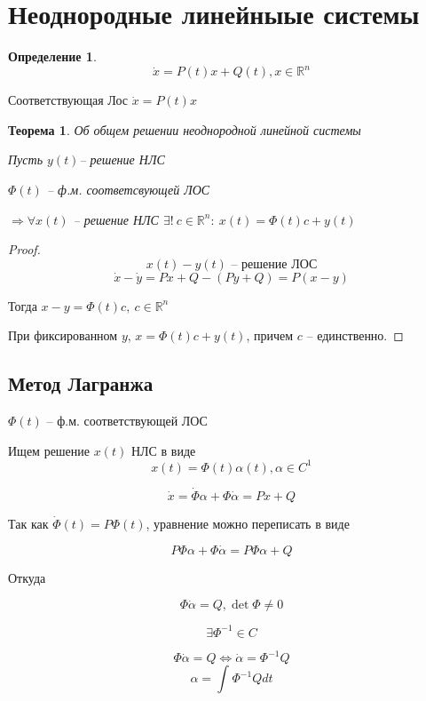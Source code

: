 \documentclass[a4paper]{article}
\theoremstyle{indented}
\newtheorem*{theorem}{Теорема}
\theoremstyle{definition}
\newtheorem*{defn}{Определение}
\theoremstyle{remark}
\begin{document}
\section{Неоднородные линейныые системы}
\begin{defn}
  \[\dot x = P(t) x + Q(t), x \in \mathbb{R}^n\]
\end{defn}
\begin{center}
  Соответствующая Лос $\dot x = P(t) x$
\end{center}

\begin{theorem}
  Об общем решении неоднородной линейной системы

  Пусть $y(t) $-- решение НЛС

  $\Phi(t)$ -- ф.м. соответсвующей ЛОС

  $\Rightarrow \forall x(t)$ -- решение НЛС $\exists ! \ c \in \mathbb{R}^n: \ x(t) = \Phi(t)c + y(t)$
\end{theorem}
\begin{proof}
  \[x(t) - y(t) \text{ -- решение ЛОС}\]
  \[\dot x - \dot y = Px + Q - (Py +Q) = P(x-y)\]
  
  Тогда $x - y = \Phi(t) c, \ c \in \mathbb{R}^n$

  При фиксированном $y$, $x = \Phi(t) c + y(t)$, причем $c$ -- единственно.
  
\end{proof}

\subsection{Метод Лагранжа}

$\Phi(t)$ -- ф.м. соответствующей ЛОС

Ищем решение $x(t)$ НЛС в виде
\[x(t) = \Phi(t) \alpha(t), \alpha \in C^1\]

\[\dot x = \dot \Phi \alpha + \Phi \dot \alpha =Px + Q\]
\begin{center}
  Так как $\dot \Phi(t) = P \Phi(t)$, уравнение можно переписать в виде
\end{center}

\[P \Phi \alpha + \Phi \dot \alpha = P \Phi \alpha + Q\]
\begin{center}
  Откуда
\end{center}
\[\Phi \dot \alpha = Q, \det \Phi \neq 0\]

\[\exists \Phi^{-1} \in C\]

\[\Phi \dot \alpha = Q \Leftrightarrow \dot \alpha = \Phi^{-1}Q\]
\[\alpha = \int_{}^{}\Phi^{-1}Qdt\]
\end{document}
